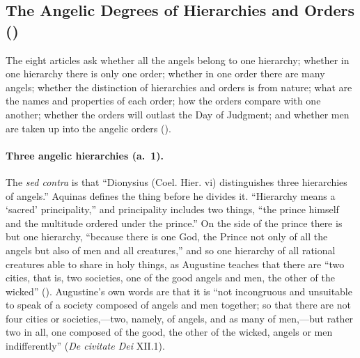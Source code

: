 \subsection{The Angelic Degrees of Hierarchies and Orders ()}\label{sec:q108}

The eight articles ask whether all the angels belong to one hierarchy;
whether in one hierarchy there is only one order; whether in one order
there are many angels; whether the distinction of hierarchies and orders is
from nature; what are the names and properties of each order; how the
orders compare with one another; whether the orders will outlast the Day of
Judgment; and whether men are taken up into the angelic orders ().

\paragraph{Three angelic hierarchies (a.~1).} The \emph{sed contra} is
that ``Dionysius (Coel. Hier. vi) distinguishes three hierarchies of
angels.'' Aquinas defines the thing before he divides it. ``Hierarchy means
a `sacred' principality,'' and principality includes two things, ``the
prince himself and the multitude ordered under the prince.'' On the side of
the prince there is but one hierarchy, ``because there is one God, the
Prince not only of all the angels but also of men and all creatures,'' and
so one hierarchy of all rational creatures able to share in holy things,
as Augustine teaches that there are ``two cities, that is, two societies,
one of the good angels and men, the other of the wicked'' (). Augustine's own words are that it is ``not incongruous and
unsuitable to speak of a society composed of angels and men together; so
that there are not four cities or societies,---two, namely, of angels, and
as many of men,---but rather two in all, one composed of the good, the other
of the wicked, angels or men indifferently'' (\emph{De civitate Dei}
XII.1).

